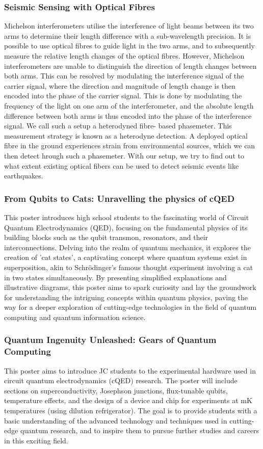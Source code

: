 \documentclass[12pt,a4paper]{article}
\begin{document}
\subsubsection{Seismic Sensing with Optical Fibres}
Michelson interferometers utilise the interference of light beams between its two arms to determine their length difference with a sub-wavelength precision. It is possible to use optical fibres to guide light in the two arms, and to subsequently measure the relative length changes of the optical fibres. However, Michelson interferometers are unable to distinguish the direction of length changes between both arms. This can be resolved by modulating the interference signal of the carrier signal, where the direction and magnitude of length change is then encoded into the phase of the carrier signal. This is done by modulating the frequency of the light on one arm of the interferometer, and the absolute length difference between both arms is thus encoded into the phase of the interference signal. We call such a setup a heterodyned fibre- based phasemeter. This measurement strategy is known as a heterodyne detection. A deployed optical fibre in the ground experiences strain from environmental sources, which we can then detect hrough such a phasemeter. With our setup, we try to find out to what extent existing optical fibers can be used to detect seismic events like earthquakes.

\subsubsection{From Qubits to Cats: Unravelling the physics of cQED}
This poster introduces high school students to the fascinating world of Circuit Quantum Electrodynamics (QED), focusing on the fundamental physics of its building blocks such as the qubit transmon, resonators, and their interconnections. Delving into the realm of quantum mechanics, it explores the creation of 'cat states', a captivating concept where quantum systems exist in superposition, akin to Schr\"{o}dinger's famous thought experiment involving a cat in two states simultaneously. By presenting simplified explanations and illustrative diagrams, this poster aims to spark curiosity and lay the groundwork for understanding the intriguing concepts within quantum physics, paving the way for a deeper exploration of cutting-edge technologies in the field of quantum computing and quantum information science.

\subsubsection{Quantum Ingenuity Unleashed: Gears of Quantum Computing}
This poster aims to introduce JC students to the experimental hardware used in circuit quantum electrodynamics (cQED) research. The poster will include sections on superconductivity, Josephson junctions, flux-tunable qubits, temperature effects, and the design of a device and chip for experiments at mK temperatures (using dilution refrigerator). The goal is to provide students with a basic understanding of the advanced technology and techniques used in cutting-edge quantum research, and to inspire them to pursue further studies and careers in this exciting field.
\pagebreak
\end{document}
